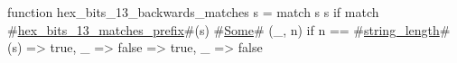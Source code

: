 function hex_bits_13_backwards_matches s = match s {
  s if match #\hyperref[sailRISCVzhexzybitszy13zymatcheszyprefix]{hex\_bits\_13\_matches\_prefix}#(s) {
    #\hyperref[sailRISCVzSome]{Some}# (_, n) if n == #\hyperref[sailRISCVzstringzylength]{string\_length}#(s) => true,
    _ => false
  } => true,
  _ => false
}
